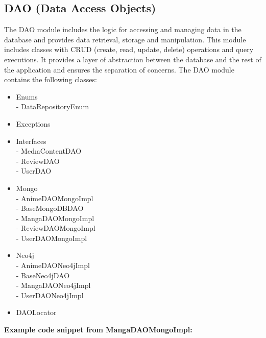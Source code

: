 \subsection*{DAO (Data Access Objects)}
The DAO module includes the logic for accessing and managing data in the database and provides data retrieval, 
storage and manipulation. This module includes classes with CRUD (create, read, update, delete) operations and query executions. 
It provides a layer of abstraction between the database and the rest of the application and ensures the separation of concerns. The DAO module contains the following classes:
\begin{itemize}
    \item Enums \\
    - DataRepositoryEnum
    \item Exceptions 
    \item Interfaces \\
    - MedıaContentDAO \\
    - ReviewDAO \\
    - UserDAO 
    \item Mongo \\
    - AnimeDAOMongoImpl \\
    - BaseMongoDBDAO \\
    - MangaDAOMongoImpl \\
    - ReviewDAOMongoImpl \\
    - UserDAOMongoImpl 
    \item Neo4j \\
    - AnimeDAONeo4jImpl \\
    - BaseNeo4jDAO \\
    - MangaDAONeo4jImpl \\
    - UserDAONeo4jImpl 
    \item DAOLocator 
\end{itemize}
\newpage
\textbf{Example code snippet from MangaDAOMongoImpl:}
